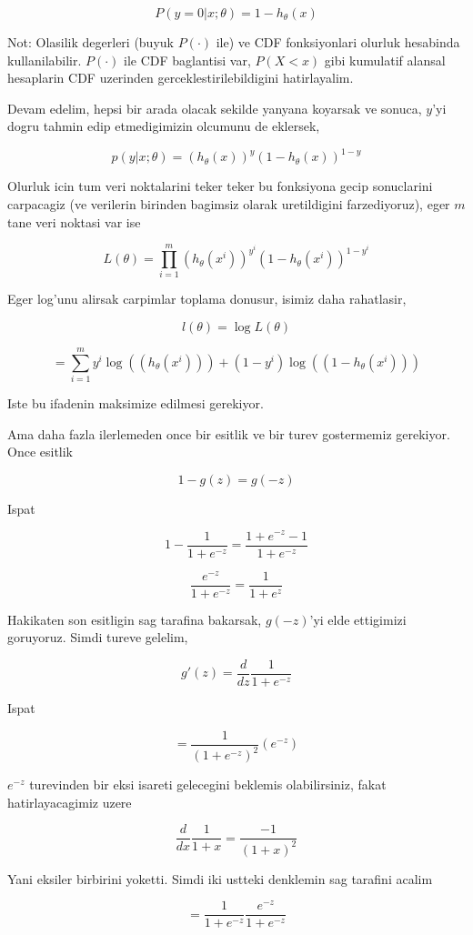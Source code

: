 \documentclass[12pt,fleqn]{article}\usepackage{../common}
\begin{document}
$$ P(y=0 | x;\theta) = 1 - h_\theta(x) $$

Not: Olasilik degerleri (buyuk $P(\cdot)$ ile) ve CDF fonksiyonlari
olurluk hesabinda kullanilabilir. $P(\cdot)$ ile CDF baglantisi var,
$P(X<x)$ gibi kumulatif alansal hesaplarin CDF uzerinden
gerceklestirilebildigini hatirlayalim.

Devam edelim, hepsi bir arada olacak sekilde yanyana koyarsak ve
sonuca, $y$'yi dogru tahmin edip etmedigimizin olcumunu de eklersek,

$$p(y | x;\theta) = (h_\theta(x))^y (1-h_\theta(x))^{1-y}$$

Olurluk icin tum veri noktalarini teker teker bu fonksiyona gecip
sonuclarini carpacagiz (ve verilerin birinden bagimsiz olarak
uretildigini farzediyoruz), eger $m$ tane veri noktasi var ise

$$ L(\theta) = \prod_{i=1}^{m} (h_\theta(x^i))^{y^i}
(1-h_\theta(x^i))^{1-{y^i}}$$

Eger log'unu alirsak carpimlar toplama donusur, isimiz daha rahatlasir,

$$ l(\theta) = \log L(\theta) $$

$$ = \sum_{i=1}^{m}
     y^i \log( (h_\theta(x^i)) ) +
     (1-{y^i}) \log( (1-h_\theta(x^i)) )
$$

Iste bu ifadenin maksimize edilmesi gerekiyor.

Ama daha fazla ilerlemeden once bir esitlik ve bir turev gostermemiz
gerekiyor.  Once esitlik

$$ 1-g(z) = g(-z) $$

Ispat

$$ 1-\frac{1}{1+e^{-z}}  = \frac{1+e^{-z}-1}{1+e^{-z}}$$

$$ \frac{e^{-z}}{1+e^{-z}} = \frac{1}{1+e^{z}}$$

Hakikaten son esitligin sag tarafina bakarsak, $g(-z)$'yi elde ettigimizi
goruyoruz. Simdi tureve gelelim,

$$
g'(z) = \frac{d}{dz} \frac{ 1}{1+ e^{ -z}} 
$$

Ispat

$$
= \frac{1}{(1+ e^{-z})^2} (e^{-z}) 
$$

$e^{ -z}$ turevinden bir eksi isareti gelecegini beklemis olabilirsiniz,
fakat hatirlayacagimiz uzere 

$$\frac{d}{dx} \frac{ 1}{1+x}  = \frac{-1}{(1+x)^2}$$

Yani eksiler birbirini yoketti. Simdi iki ustteki denklemin sag tarafini
acalim

$$
 = \frac{1}{1+e^{-z}} \frac{e^{-z}}{1+e^{-z}}
$$
\end{document}
